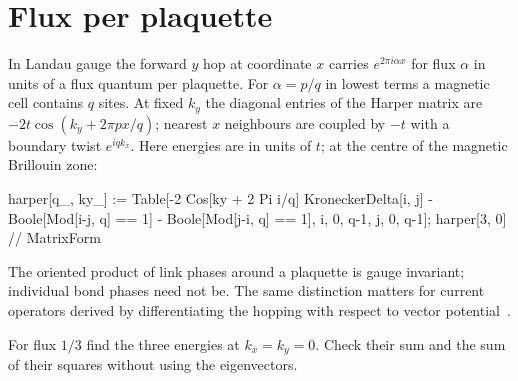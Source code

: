 \section{Flux per plaquette}
In Landau gauge the forward $y$ hop at coordinate $x$ carries
$e^{2\pi i\alpha x}$ for flux $\alpha$ in units of a flux quantum per
plaquette. For $\alpha=p/q$ in lowest terms a magnetic cell contains
$q$ sites. At fixed $k_y$ the diagonal entries of the Harper matrix
are $-2t\cos(k_y+2\pi p x/q)$; nearest $x$ neighbours are coupled
by $-t$ with a boundary twist $e^{iqk_x}$. Here energies are in units
of $t$; at the centre of the magnetic Brillouin zone:
\begin{wl}
harper[q_, ky_] := Table[-2 Cos[ky + 2 Pi i/q] KroneckerDelta[i, j] -
  Boole[Mod[i-j, q] == 1] - Boole[Mod[j-i, q] == 1],
  {i, 0, q-1}, {j, 0, q-1}];
harper[3, 0] // MatrixForm
\end{wl}
The oriented product of link phases around a plaquette is gauge
invariant; individual bond phases need not be. The same distinction
matters for current operators derived by differentiating the hopping
with respect to vector potential~\cite{vucicevic}.
\begin{exercise}\label{ex:harper}
For flux $1/3$ find the three energies at $k_x=k_y=0$. Check their
sum and the sum of their squares without using the eigenvectors.
\end{exercise}
